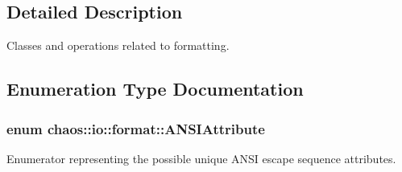\subsection{Detailed Description}
Classes and operations related to formatting. 

\subsection{Enumeration Type Documentation}
\hypertarget{namespacechaos_1_1io_1_1format_af01119682ec0bc616b49641e0c2a7ccf}{}
\subsubsection[{A\+N\+S\+I\+Attribute}]{\setlength{\rightskip}{0pt plus 5cm}enum {\bf chaos\+::io\+::format\+::\+A\+N\+S\+I\+Attribute}}\label{namespacechaos_1_1io_1_1format_af01119682ec0bc616b49641e0c2a7ccf}


Enumerator representing the possible unique A\+N\+S\+I escape sequence attributes. 

